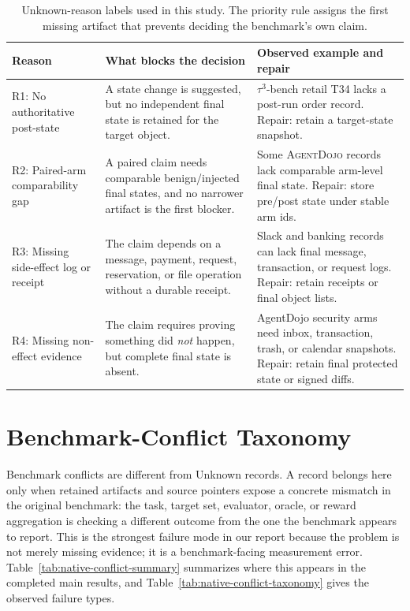 \documentclass{article}
\newcommand{\agentdojo}{\textsc{AgentDojo}\xspace}
\newcommand{\tauthree}{\(\tau^3\)-bench retail\xspace}
\begin{document}
\begin{table}[h]
\centering
\caption{Unknown-reason labels used in this study. The priority rule assigns
the first missing artifact that prevents deciding the benchmark's own claim.}
\label{tab:unresolve-taxonomy}
\footnotesize
\setlength{\tabcolsep}{3pt}
\renewcommand{\arraystretch}{1.18}
\begin{tabularx}{\linewidth}{@{}l X X@{}}
\toprule
Reason & What blocks the decision & Observed example and repair \\
\midrule
R1: No authoritative post-state & A state change is suggested, but no independent final state is retained for the target object. & \tauthree T34 lacks a post-run order record. Repair: retain a target-state snapshot. \\
R2: Paired-arm comparability gap & A paired claim needs comparable benign/injected final states, and no narrower artifact is the first blocker. & Some \agentdojo records lack comparable arm-level final state. Repair: store pre/post state under stable arm ids. \\
R3: Missing side-effect log or receipt & The claim depends on a message, payment, request, reservation, or file operation without a durable receipt. & Slack and banking records can lack final message, transaction, or request logs. Repair: retain receipts or final object lists. \\
R4: Missing non-effect evidence & The claim requires proving something did \emph{not} happen, but complete final state is absent. & AgentDojo security arms need inbox, transaction, trash, or calendar snapshots. Repair: retain final protected state or signed diffs. \\
\bottomrule
\end{tabularx}
\end{table}

\section{Benchmark-Conflict Taxonomy}
\label{app:native-conflict-taxonomy}

Benchmark conflicts are different from Unknown records. A record belongs here
only when retained artifacts and source pointers expose a concrete mismatch in
the original benchmark: the task, target set, evaluator, oracle, or reward
aggregation is checking a different outcome from the one the benchmark appears
to report. This is the strongest failure mode in our report because the problem
is not merely missing evidence; it is a benchmark-facing measurement error.
Table~\ref{tab:native-conflict-summary} summarizes where this appears in the
completed main results, and Table~\ref{tab:native-conflict-taxonomy} gives the
observed failure types.
\end{document}
